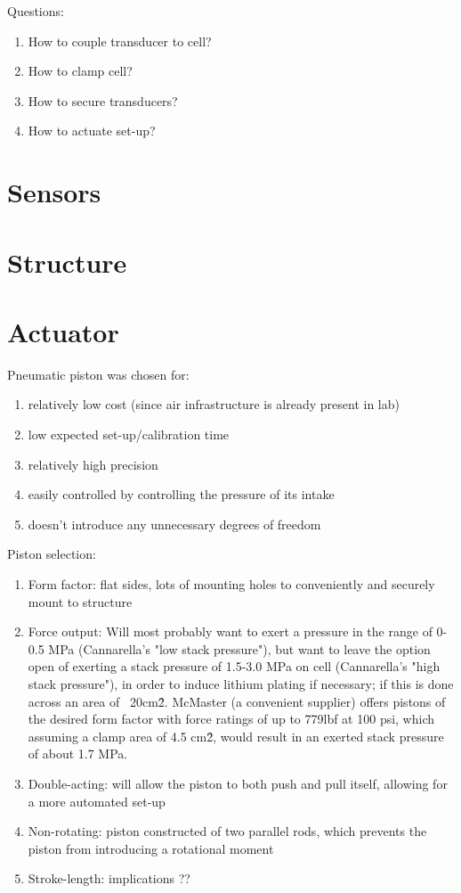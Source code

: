 Questions:
\begin{enumerate}
	\item How to couple transducer to cell?
	\item How to clamp cell?
	\item How to secure transducers?
    \item How to actuate set-up?
\end{enumerate}

\section{Sensors}

\section{Structure}

\section{Actuator}
Pneumatic piston was chosen for:
\begin{enumerate}
    \item relatively low cost (since air infrastructure is already present in lab)
    \item low expected set-up/calibration time
    \item relatively high precision
    \item easily controlled by controlling the pressure of its intake
    \item doesn't introduce any unnecessary degrees of freedom
\end{enumerate}

Piston selection:
\begin{enumerate}
    \item Form factor: flat sides, lots of mounting holes to conveniently and securely mount to structure
    \item Force output: Will most probably want to exert a pressure in the range of 0-0.5 MPa (Cannarella's "low stack pressure"), but want to leave the option open of exerting a stack pressure of 1.5-3.0 MPa on cell (Cannarella's "high stack pressure"), in order to induce lithium plating if necessary; if this is done across an area of ~20cm\^2. McMaster (a convenient supplier) offers pistons of the desired form factor with force ratings of up to 779lbf at 100 psi, which assuming a clamp area of 4.5 cm\^2, would result in an exerted stack pressure of about 1.7 MPa.
    \item Double-acting: will allow the piston to both push and pull itself, allowing for a more automated set-up
    \item Non-rotating: piston constructed of two parallel rods, which prevents the piston from introducing a rotational moment
    \item Stroke-length: implications ??
\end{enumerate}
    